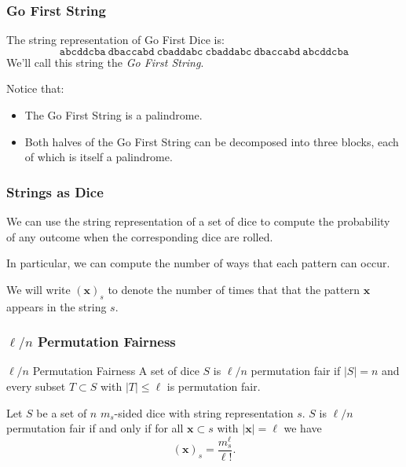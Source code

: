 \documentclass[aspectratio=169]{beamer}
\begin{document}
\begin{frame}[triangle=siiblue]
\frametitle{Go First String}
The string representation of Go First Dice is:
\begin{equation*}
	\texttt{abcddcba} \ \texttt{dbaccabd} \ \texttt{cbaddabc} \  \texttt{cbaddabc} \ \texttt{dbaccabd} \ \texttt{abcddcba}
\end{equation*}
We'll call this string the \emph{Go First String}.

\vfill

Notice that:
\begin{itemize}
	\item The Go First String is a palindrome.  
	\item Both halves of the Go First String can be decomposed into three blocks, each of which is itself a palindrome.
\end{itemize}
\end{frame}

\begin{frame}[triangle=siiblue]
\frametitle{Strings as Dice}
We can use the string representation of a set of dice to compute the probability of any outcome when the corresponding dice are rolled.

\vfill

In particular, we can compute the number of ways that each pattern can occur.

\vfill

We will write $(\mathbf{x})_s$ to denote the number of times that that the pattern $\mathbf{x}$ appears in the string $s$.

\end{frame}

\begin{frame}[triangle=siiblue]
\frametitle{$\ell/n$ Permutation Fairness}
\begin{siidefinition}{$\ell/n$ Permutation Fairness}{}
	A set of dice $S$ is $\ell/n$ permutation fair if $|S| = n$ and every subset $T \subset S$ with $|T| \leq \ell$ is permutation fair.
\end{siidefinition}

\vfill

\begin{siilemma}[label=perm_fair_counts]{}{}
Let $S$ be a set of $n$ $m_s$-sided dice with string representation $s$.  $S$ is $\ell/n$ permutation fair if and only if for all $\mathbf{x} \subset s$ with $|\mathbf{x}| = \ell$ we have
\begin{equation*}
(\mathbf{x})_s = \frac{m_s^{\ell}}{\ell!}.
\end{equation*}
\end{siilemma}
\end{frame}
\end{document}
